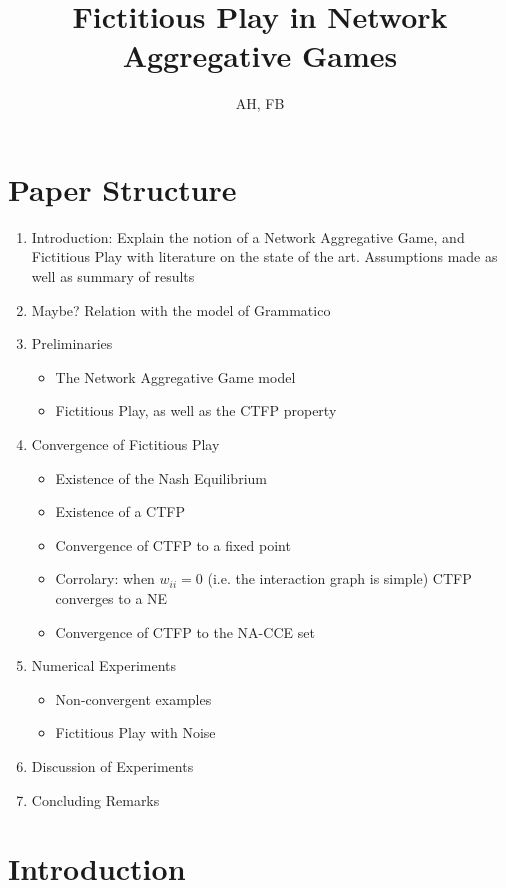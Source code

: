 \documentclass{article}
\title{Fictitious Play in Network Aggregative Games}
\author{AH, FB}
\theoremstyle{definition}
\begin{document}
	
	\maketitle

	\section{Paper Structure}

	\begin{enumerate}
		\item Introduction: Explain the notion of a Network Aggregative Game, and Fictitious Play
		with literature on the state of the art. Assumptions made as well as summary of results
		\item Maybe? Relation with the model of Grammatico
		\item Preliminaries \begin{itemize}
			\item The Network Aggregative Game model
			\item Fictitious Play, as well as the CTFP property
		\end{itemize}
		\item Convergence of Fictitious Play \begin{itemize}
			\item Existence of the Nash Equilibrium
			\item Existence of a CTFP
			\item Convergence of CTFP to a fixed point
			\item Corrolary: when $w_{ii} = 0$ (i.e. the interaction graph is simple) CTFP converges
			to a NE
			\item Convergence of CTFP to the NA-CCE set
		\end{itemize}
		\item Numerical Experiments \begin{itemize}
			\item Non-convergent examples
			\item Fictitious Play with Noise
		\end{itemize}
		\item Discussion of Experiments
		\item Concluding Remarks
	\end{enumerate}
	
	\newpage
	\section{Introduction}
\end{document}

